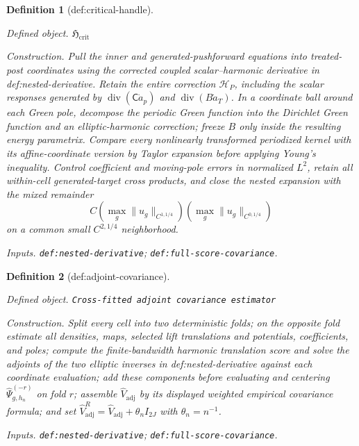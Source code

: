\documentclass{article}
\newtheorem{definition}{Definition}
\begin{document}
\begin{definition}[def:critical-handle]\label{def:critical-handle}
\par\smallskip\noindent\emph{Defined object.} \(\mathfrak H_{\mathrm{crit}}\)
\par\smallskip\noindent\emph{Construction.} Pull the inner and generated-pushforward equations into treated-post coordinates using the corrected coupled scalar--harmonic derivative in def:nested-derivative.  Retain the entire correction \(\mathcal H_P\), including the scalar responses generated by \(\operatorname{div}(\mathsf C\dot a_p)\) and \(\operatorname{div}(B\dot a_T)\).  In a coordinate ball around each Green pole, decompose the periodic Green function into the Dirichlet Green function and an elliptic-harmonic correction; freeze \(B\) only inside the resulting energy parametrix.  Compare every nonlinearly transformed periodized kernel with its affine-coordinate version by Taylor expansion before applying Young's inequality.  Control coefficient and moving-pole errors in normalized \(L^2\), retain all within-cell generated-target cross products, and close the nested expansion with the mixed remainder
\[
 C\left(\max_g\lVert u_g\rVert_{C^{1,1/4}}\right)
  \left(\max_g\lVert u_g\rVert_{C^{0,1/4}}\right)
\]
on a common small \(C^{2,1/4}\) neighborhood.
\par\smallskip\noindent\emph{Inputs.} \texttt{def:\allowbreak{}nested-\allowbreak{}derivative}; \texttt{def:\allowbreak{}full-\allowbreak{}score-\allowbreak{}covariance}.
\end{definition}

\begin{definition}[def:adjoint-covariance]\label{def:adjoint-covariance}
\par\smallskip\noindent\emph{Defined object.} \texttt{Cross-\allowbreak{}fitted adjoint covariance estimator}
\par\smallskip\noindent\emph{Construction.} Split every cell into two deterministic folds; on the opposite fold estimate all densities, maps, selected lift translations and potentials, coefficients, and poles; compute the finite-bandwidth harmonic translation score and solve the adjoints of the two elliptic inverses in def:nested-derivative against each coordinate evaluation; add these components before evaluating and centering \(\widehat\Psi_{g,h_n}^{(-r)}\) on fold \(r\); assemble \(\widehat V_{\mathrm{adj}}\) by its displayed weighted empirical covariance formula; and set \(\widehat V_{\mathrm{adj}}^{R}=\widehat V_{\mathrm{adj}}+\theta_n I_{2J}\) with \(\theta_n=n^{-1}\).
\par\smallskip\noindent\emph{Inputs.} \texttt{def:\allowbreak{}nested-\allowbreak{}derivative}; \texttt{def:\allowbreak{}full-\allowbreak{}score-\allowbreak{}covariance}.
\end{definition}
\end{document}
